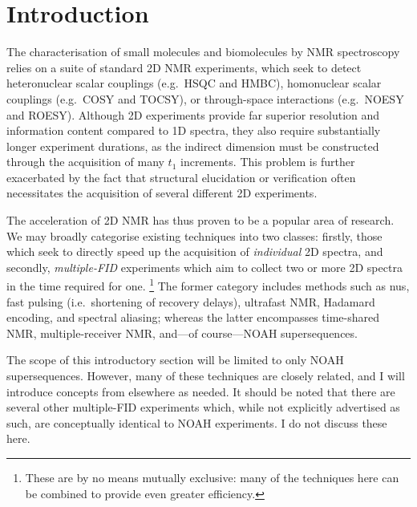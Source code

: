 \section{Introduction}
\label{sec:noah__introduction}

The characterisation of small molecules and biomolecules by NMR spectroscopy relies on a suite of standard 2D NMR experiments, which seek to detect heteronuclear scalar couplings (e.g.\ HSQC and HMBC), homonuclear scalar couplings (e.g.\ COSY and TOCSY), or through-space interactions (e.g.\ NOESY and ROESY).
Although 2D experiments provide far superior resolution and information content compared to 1D spectra, they also require substantially longer experiment durations, as the indirect dimension must be constructed through the acquisition of many $t_1$ increments.
This problem is further exacerbated by the fact that structural elucidation or verification often necessitates the acquisition of several different 2D experiments.

The acceleration of 2D NMR has thus proven to be a popular area of research.
We may broadly categorise existing techniques into two classes: firstly, those which seek to directly speed up the acquisition of \textit{individual} 2D spectra, and secondly, \textit{multiple-FID} experiments which aim to collect two or more 2D spectra in the time required for one.%
\footnote{These are by no means mutually exclusive: many of the techniques here can be combined to provide even greater efficiency.}
The former category includes methods such as 
\acf{nus}\autocite{Barna1987JMR,Kazimierczuk2010PNMRS,Mobli2014PNMRS,Kazimierczuk2015MRC},
fast pulsing (i.e.\ shortening of recovery delays)\autocite{SchulzeSunninghausen2014JACS,Schanda2006JACS,Kupce2007MRC,Schanda2009PNMRS},
ultrafast NMR\autocite{Frydman2002PNASUSA,Pelupessy2003JACS,Frydman2003JACS,Tal2010PNMRS,Gouilleux2018ARNMRS,Kupce2021NRMP},
Hadamard encoding\autocite{Kupce2003JMR,Kupce2003PNMRS},
and spectral aliasing\autocite{Jeannerat2000MRC,Bermel2009JACS,Njock2010C};
whereas the latter encompasses 
time-shared NMR\autocite{Nolis2007ACIE,Parella2010CMR},
multiple-receiver NMR\autocite{Kupce2006JACS,Kupce2008JACS,Kovacs2016MRC},
and---of course---NOAH supersequences\autocite{Kupce2017ACIE,Kupce2021PNMRS,Kupce2021NRMP}.

The scope of this introductory section will be limited to only NOAH supersequences.
However, many of these techniques are closely related, and I will introduce concepts from elsewhere as needed.
It should be noted that there are several other multiple-FID experiments which, while not explicitly advertised as such, are conceptually identical to NOAH experiments.\autocite{Nagy2019CC,Nagy2020JMR,Nagy2021ACIE,Timari2022CC}
I do not discuss these here.




